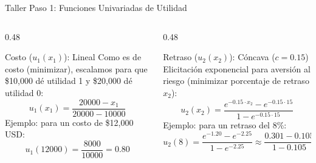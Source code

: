 \documentclass[aspectratio=169, 10pt]{beamer}
\begin{document}
\begin{frame}{Taller Paso 1: Funciones Univariadas de Utilidad}
    \begin{columns}[T]
        \begin{column}{0.48\textwidth}
            \begin{block}{Costo ($u_1(x_1)$): Lineal}
                \scriptsize
                Como es de costo (minimizar), escalamos para que \$10,000 dé utilidad 1 y \$20,000 dé utilidad 0:
                \begin{equation*}
                    u_1(x_1) = \frac{20000 - x_1}{20000 - 10000}
                \end{equation*}
                Ejemplo: para un costo de \$12,000 USD:
                \begin{equation*}
                    u_1(12000) = \frac{8000}{10000} = 0.80
                \end{equation*}
            \end{block}
        \end{column}
        
        \begin{column}{0.48\textwidth}
            \begin{block}{Retraso ($u_2(x_2)$): Cóncava ($c=0.15$)}
                \scriptsize
                Elicitación exponencial para aversión al riesgo (minimizar porcentaje de retraso $x_2$):
                \begin{equation*}
                    u_2(x_2) = \frac{e^{-0.15 \cdot x_2} - e^{-0.15 \cdot 15}}{1 - e^{-0.15 \cdot 15}}
                \end{equation*}
                Ejemplo: para un retraso del 8\%:
                \begin{equation*}
                    u_2(8) = \frac{e^{-1.20} - e^{-2.25}}{1 - e^{-2.25}} \approx \frac{0.301 - 0.105}{1 - 0.105} \approx 0.219
                \end{equation*}
            \end{block}
        \end{column}
    \end{columns}
\end{frame}
\end{document}
